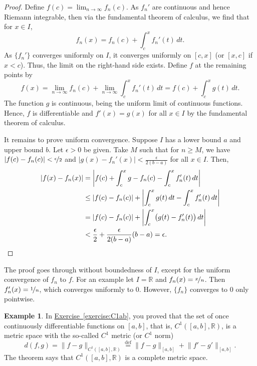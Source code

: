\documentclass[12pt,openany]{book}
\newcommand{\snorm}[1]{\lVert {#1} \rVert}
\newcommand{\abs}[1]{\left\lvert {#1} \right\rvert}
\newcommand{\R}{{\mathbb{R}}}
\theoremstyle{plain}
\theoremstyle{remark}
\theoremstyle{definition}
\theoremstyle{exercise}
\theoremstyle{example}
\newtheorem{example}[thm]{Example}
\newcommand{\exerciseref}[1]{\hyperref[#1]{Exercise~\ref*{#1}}}
\begin{document}
\begin{proof}
Define $f(c) = \lim_{n\to \infty} f_n(c)$.
As $f_n'$ are continuous and hence Riemann integrable,
then
via the fundamental theorem of calculus, we find that for $x \in I$,
\begin{equation*}
f_n(x) = f_n(c) + \int_c^x f_n' (t)\, dt.
\end{equation*}
As $\{ f_n' \}$ converges uniformly on $I$, it converges uniformly
on $[c,x]$ (or $[x,c]$ if $x < c$).
Thus, the limit on the right-hand side exists.
Define $f$ at the remaining points by
\begin{equation*}
f(x) =
\lim_{n\to\infty} f_n(c) + \lim_{n\to\infty} \int_c^x f_n' (t)\, dt
=
f(c) + \int_c^x g(t)\,dt .
\end{equation*}
The function $g$ is continuous, being the uniform limit of continuous
functions.  Hence, $f$ is differentiable and $f'(x) = g(x)$ for all $x \in I$
by the fundamental theorem of calculus.

It remains to prove
uniform convergence.
Suppose $I$ has a lower bound $a$ and upper bound $b$.
Let $\epsilon > 0$ be given.  Take $M$
such that for $n \geq M$, we have
$\abs{f(c)-f_n(c)} < \nicefrac{\epsilon}{2}$
and
$\abs{g(x)-f_n'(x)} < \frac{\epsilon}{2(b-a)}$
for all $x \in I$.  Then,
\begin{equation*}
\begin{split}
\abs{f(x) - f_n(x)} & =
\abs{f(c) + \int_c^x g - f_n(c) - \int_c^x f_n'(t)\,dt}
\\
& \leq
\abs{f(c) - f_n(c)} + \abs{\int_c^x g(t)\,dt - \int_c^x f_n'(t)\,dt}
\\
& =
\abs{f(c) - f_n(c)} + \abs{\int_c^x \bigl(g(t) - f_n'(t)\bigr) \, dt}
\\
& <
\frac{\epsilon}{2}
+
\frac{\epsilon}{2(b-a)}
(b-a)
=\epsilon. \qedhere
\end{split}
\end{equation*}
\end{proof}

The proof goes through without boundedness of $I$, except for the
uniform convergence of $f_n$ to $f$.  For an example let $I = \R$ and
$f_n(x) = \nicefrac{x}{n}$.  Then $f_n'(x)=\nicefrac{1}{n}$, which
converges uniformly to $0$.  However, $\{f_n\}$ converges to $0$ only pointwise.

\begin{example}
In \exerciseref{exercise:C1ab}, you proved that
the set of once continuously differentiable functions on $[a,b]$, that is,
$C^1([a,b],\R)$, is a metric space with the so-called
$C^1$ metric (or $C^1$ norm)
\begin{equation*}
d(f,g) =
\snorm{f-g}_{C^1([a,b],\R)}
\overset{\text{def}}{=}
\snorm{f-g}_{[a,b]} + \snorm{f'-g'}_{[a,b]}.
\end{equation*}
The theorem says that $C^1([a,b],\R)$ is a complete metric space.
\end{example}
\end{document}
